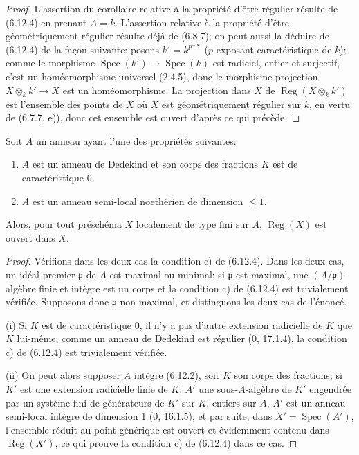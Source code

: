 \begin{proof}
L'assertion du corollaire relative à la propriété d'être régulier résulte de
(6.12.4) en prenant $A=k$. L'assertion relative à la propriété d'être
géométriquement régulier résulte déjà de (6.8.7); on peut aussi la déduire de
(6.12.4) de la façon suivante: posons $k'=k^{p^{-\infty}}$ ($p$ exposant
caractéristique de $k$); comme le morphisme
$\operatorname{Spec}(k')\to\operatorname{Spec}(k)$ est radiciel, entier et
surjectif, c'est un homéomorphisme universel (2.4.5), donc le morphisme
projection $X\otimes_kk'\to X$ est un homéomorphisme. La projection dans
$X$ de $\operatorname{Reg}(X\otimes_kk')$ est l'ensemble des points de $X$
où $X$ est géométriquement régulier sur $k$, en vertu de (6.7.7, e)), donc
cet ensemble est ouvert d'après ce qui précède.
\end{proof}

\begin{corollary}[6.12.6]
\label{IV.2.s6.12.6-fr}
Soit $A$ un anneau ayant l'une des propriétés suivantes:
\begin{enumerate}
\item[(i)] $A$ est un anneau de Dedekind et son corps des fractions $K$ est
de caractéristique 0.
\item[(ii)] $A$ est un anneau semi-local noethérien de dimension $\leq1$.
\end{enumerate}
Alors, pour tout préschéma $X$ localement de type fini sur $A$,
$\operatorname{Reg}(X)$ est ouvert dans $X$.
\end{corollary}

\begin{proof}
Vérifions dans les deux cas la condition c) de (6.12.4). Dans les deux cas,
un idéal premier $\mathfrak p$ de $A$ est maximal ou minimal; si
$\mathfrak p$ est maximal, une $(A/\mathfrak p)$-algèbre finie et intègre
est un corps et la condition c) de (6.12.4) est trivialement vérifiée.
Supposons donc $\mathfrak p$ non maximal, et distinguons les deux cas de
l'énoncé.

(i) Si $K$ est de caractéristique 0, il n'y a pas d'autre extension
radicielle de $K$ que $K$ lui-même; comme un anneau de Dedekind est régulier
(0, 17.1.4), la condition c) de (6.12.4) est trivialement vérifiée.

(ii) On peut alors supposer $A$ intègre (6.12.2), soit $K$ son corps des
fractions; si $K'$ est une extension radicielle finie de $K$, $A'$ une
sous-$A$-algèbre de $K'$ engendrée par un système fini de générateurs de
$K'$ sur $K$, entiers sur $A$, $A'$ est un anneau semi-local intègre de
dimension 1 (0, 16.1.5), et par suite, dans
$X'=\operatorname{Spec}(A')$, l'ensemble réduit au point générique est
ouvert et évidemment contenu dans $\operatorname{Reg}(X')$, ce qui prouve
la condition c) de (6.12.4) dans ce cas.
\end{proof}


